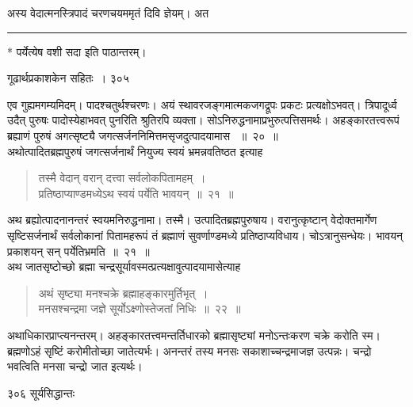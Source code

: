 \documentclass[11pt, openany]{book}
\begin{document}
 अस्य वेदात्मनस्त्रिपादं चरणचयममृतं दिवि ज्ञेयम्। अत \textendash


\noindent\rule{\linewidth}{.5pt}

\begin{center}
 * पर्येत्येष वशी सदा इति पाठान्तरम्।
\end{center}

\newpage

\hspace{3cm} गूढार्थप्रकाशकेन सहितः~। \hfill ३०५
\vspace{1cm}


\noindent एव गुह्यमगम्यमिदम्। पादश्चतुर्थश्चरणः। अयं स्थावरजङ्गमात्मकजगद्रूपः प्रकटः प्रत्यक्षोऽभवत्। त्रिपादूर्ध्व उदैत् पुरुषः पादोस्येहाभवत् पुनरिति श्रुतिरपि व्यक्ता। सोऽनिरुद्धनामाप्रभुरुत्पत्तिसमर्थः। अहङ्कारतत्त्वरूपं ब्रह्याणं पुरुषं अगत्सृष्ट्यै जगत्सर्जननिमित्तमसृजदुत्पादयामास ~॥~२०~॥ \\
\noindent अथोत्पादितब्रह्मपुरुषं जगत्सर्जनार्थं नियुज्य स्वयं भ्रमन्नवतिष्ठत इत्याह \textendash

\begin{quote}
{\ssi तस्मै वेदान् वरान् दत्त्वा सर्वलोकपितामहम्~।\\
प्रतिष्ठाप्याण्डमध्येऽथ स्वयं पर्येति भावयन्~॥~२१~॥ }
\end{quote}
 अथ ब्रह्योत्पादनानन्तरं स्वयमनिरुद्धनामा। तस्मै। उत्पादितब्रह्मपुरुषाय। वरानुत्कृष्टान् वेदोक्तमार्गेण सृष्टिसर्जनार्थं सर्वलोकानां पितामहरूपं तं ब्रह्माणं सुवर्णाण्डमध्ये प्रतिष्ठाप्यविधाय। चोऽत्रानुसन्धेयः। भावयन् प्रकाशयन् सन् पर्येतिभ्रमति~॥~२१~॥ \\
\noindent अथ जातसृष्टोच्छो ब्रह्मा चन्द्रसूर्यावस्मत्प्रत्यक्षावुत्पादयामासेत्याह \textendash

\begin{quote}
{\ssi अथं सृष्ट्या मनश्चक्रे ब्रह्माहङ्कारमुर्तिभृत्~।\\
मनसश्चन्द्रमा जज्ञे सूर्योऽक्ष्णोस्तेजतां निधिः~॥~२२~॥ }
\end{quote}
 अथाधिकारप्राप्त्यनन्तरम्। अहङ्कारतत्त्वमन्तर्तिधारको ब्रह्मासृष्ट्यां मनोऽन्तःकरण चक्रे करोति स्म। ब्रह्मणोऽहं सृष्टिं करोमीतोच्छा जातेत्यर्भः। अनन्तरं तस्य मनसः सकाशाच्चन्द्रमाजज्ञ उत्पन्नः। चन्द्रो भवत्विति मनसा चन्द्रो जात इत्यर्थः।
%

\newpage

\noindent ३०६ \hspace{3cm} सूर्यसिद्धान्तः
\vspace{1cm}
\end{document}
